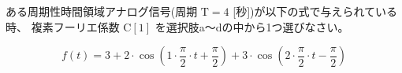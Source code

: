 ある周期性時間領域アナログ信号(周期 $\textrm{T} = 4$ [秒])が以下の式で与えられている時、
複素フーリエ係数 $\textrm{C}[1]$ を選択肢a〜dの中から1つ選びなさい。

\[
f(t) = 
3
+ 2 \cdot \cos \left ( 1 \cdot \frac{\pi}{2} \cdot t + \frac{\pi}{2} \right )
+ 3 \cdot \cos \left ( 2 \cdot \frac{\pi}{2} \cdot t - \frac{\pi}{2}  \right )
\]
